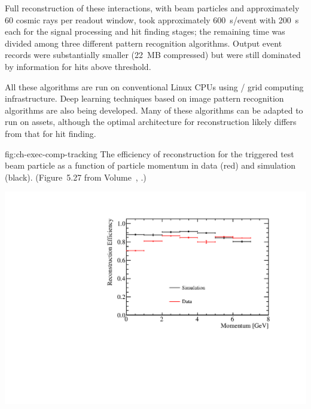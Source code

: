 Full reconstruction of these  interactions, with beam particles and approximately 60 cosmic rays per readout window, took  approximately \SI{600}{s/event} with \SI{200}{s} each for the signal processing and hit finding stages; the remaining time was divided among three different pattern recognition algorithms. Output event records were substantially smaller (\SI{22}{MB} compressed) but were still dominated by information for  hits above threshold. 

All these algorithms are run on conventional %
Linux CPUs using / grid computing  infrastructure. Deep learning techniques based on image pattern recognition algorithms are also being developed. Many of these algorithms can be adapted to run on  assets, although the optimal architecture for \threed reconstruction likely differs from that for hit finding.

\begin{dunefigure}
{fig:ch-exec-comp-tracking}
{The efficiency of reconstruction for the triggered test beam particle as a function of particle
momentum in data (red) and simulation (black). (Figure~5.27 from Volume~\volnumberphysics{}, \voltitlephysics{}.)}
\includegraphics[height=4in]{graphics/BeamParticleEfficiencyVsMomentum.pdf}
\end{dunefigure}






